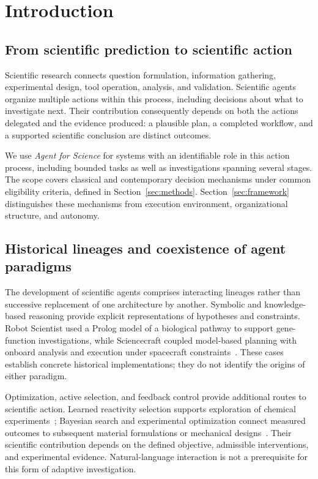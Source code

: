\section{Introduction}
\label{sec:introduction}

\subsection{From scientific prediction to scientific action}

Scientific research connects question formulation, information gathering, experimental design, tool operation, analysis, and validation. Scientific agents organize multiple actions within this process, including decisions about what to investigate next. Their contribution consequently depends on both the actions delegated and the evidence produced: a plausible plan, a completed workflow, and a supported scientific conclusion are distinct outcomes.

We use \emph{Agent for Science} for systems with an identifiable role in this action process, including bounded tasks as well as investigations spanning several stages. The scope covers classical and contemporary decision mechanisms under common eligibility criteria, defined in Section~\ref{sec:methods}. Section~\ref{sec:framework} distinguishes these mechanisms from execution environment, organizational structure, and autonomy.

\subsection{Historical lineages and coexistence of agent paradigms}

The development of scientific agents comprises interacting lineages rather than successive replacement of one architecture by another. Symbolic and knowledge-based reasoning provide explicit representations of hypotheses and constraints. Robot Scientist used a Prolog model of a biological pathway to support gene-function investigations, while Sciencecraft coupled model-based planning with onboard analysis and execution under spacecraft constraints~\cite{king2004,asd0645}. These cases establish concrete historical implementations; they do not identify the origins of either paradigm.

Optimization, active selection, and feedback control provide additional routes to scientific action. Learned reactivity selection supports exploration of chemical experiments~\cite{asd0734,asd0428}; Bayesian search and experimental optimization connect measured outcomes to subsequent material formulations or mechanical designs~\cite{burger2020,asd0504}. Their scientific contribution depends on the defined objective, admissible interventions, and experimental evidence. Natural-language interaction is not a prerequisite for this form of adaptive investigation.

